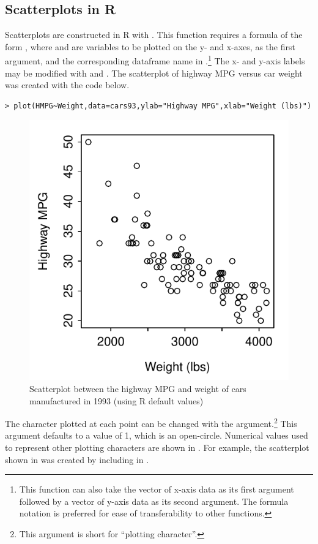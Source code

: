 \documentclass[10pt,openany]{book}\usepackage[]{graphicx}\usepackage[]{color}
\makeatletter
\newenvironment{kframe}{%
 \def\at@end@of@kframe{}%
 \ifinner\ifhmode%
  \def\at@end@of@kframe{\end{minipage}}%
  \begin{minipage}{\columnwidth}%
 \fi\fi%
 \def\FrameCommand##1{\hskip\@totalleftmargin \hskip-\fboxsep
 \colorbox{shadecolor}{##1}\hskip-\fboxsep
     \hskip-\linewidth \hskip-\@totalleftmargin \hskip\columnwidth}%
 \MakeFramed {\advance\hsize-\width
   \@totalleftmargin\z@ \linewidth\hsize
   \@setminipage}}%
 {\par\unskip\endMakeFramed%
 \at@end@of@kframe}
\newenvironment{knitrout}{}{} %
\makeatother
\begin{document}
\subsection{Scatterplots in R}
\vspace{-12pt}
Scatterplots are constructed in R with .  This function requires a formula of the form , where  and  are variables to be plotted on the y- and x-axes, as the first argument, and the corresponding dataframe name in .\footnote{This function can also take the vector of x-axis data as its first argument followed by a vector of y-axis data as its second argument.  The formula notation is preferred for ease of transferability to other functions.} The x- and y-axis labels may be modified with  and .  The scatterplot of highway MPG versus car weight  was created with the code below.
\begin{knitrout}
\color{fgcolor}\begin{kframe}
\begin{verbatim}
> plot(HMPG~Weight,data=cars93,ylab="Highway MPG",xlab="Weight (lbs)")
\end{verbatim}
\end{kframe}\begin{figure}[hbtp]

{\centering \includegraphics[width=.4\linewidth]{Figs/Scatplot1-1} 

}

\caption[Scatterplot between the highway MPG and weight of cars manufactured in 1993 (using R default values)]{Scatterplot between the highway MPG and weight of cars manufactured in 1993 (using R default values)}\label{fig:Scatplot1}
\end{figure}


\end{knitrout}

The character plotted at each point can be changed with the  argument.\footnote{This argument is short for ``plotting character''.}  This argument defaults to a value of 1, which is an open-circle.  Numerical values used to represent other plotting characters are shown in .  For example, the scatterplot shown in  was created by including  in .
\end{document}
